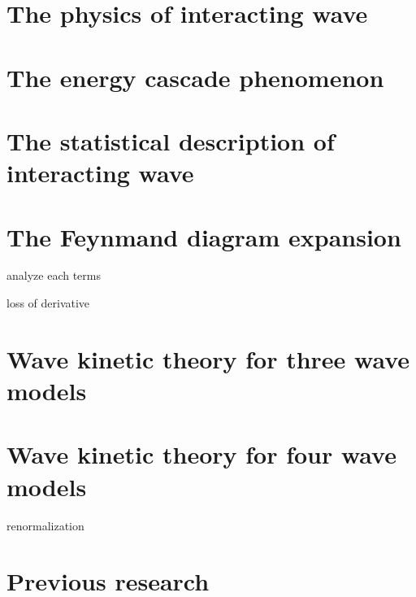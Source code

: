 \section{The physics of interacting wave}


\section{The energy cascade phenomenon}

\section{The statistical description of interacting wave}

\section{The Feynmand diagram expansion}

analyze each terms

loss of derivative

\section{Wave kinetic theory for three wave models}

\section{Wave kinetic theory for four wave models}

renormalization

\section{Previous research}